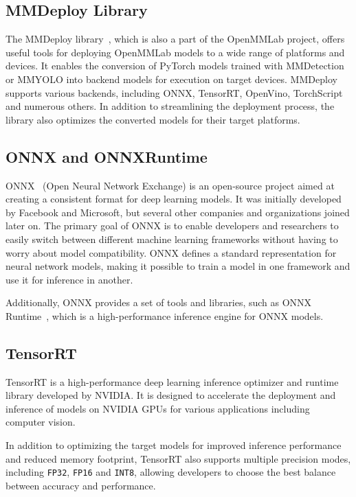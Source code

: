 \subsection{MMDeploy Library}

The MMDeploy library~\cite{MMDeploy}, which is also a part of the OpenMMLab project,
offers useful tools for deploying OpenMMLab models to a wide range of platforms
and devices. It enables the conversion of PyTorch models trained with
MMDetection or MMYOLO into backend models for execution on target devices.
MMDeploy supports various backends, including ONNX, TensorRT, OpenVino,
TorchScript and numerous others. In addition to streamlining the deployment
process, the library also optimizes the converted models for their target
platforms.


\subsection{ONNX and ONNXRuntime}

ONNX~\cite{ONNX} (Open Neural Network Exchange) is an open-source project aimed
at creating a consistent format for deep learning models. It was initially
developed by Facebook and Microsoft, but several other companies and
organizations joined later on. The primary goal of ONNX is to enable developers
and researchers to easily switch between different machine learning frameworks
without having to worry about model compatibility. ONNX defines a standard
representation for neural network models, making it possible to train a model in
one framework and use it for inference in another.

Additionally, ONNX provides a set of tools and libraries, such as ONNX
Runtime~\cite{ONNXRuntime}, which is a high-performance inference engine for
ONNX models.


\subsection{TensorRT}

TensorRT  is a high-performance deep learning inference optimizer and runtime
library developed by NVIDIA. It is designed to accelerate the deployment and
inference of models on NVIDIA GPUs for various applications including computer
vision.

In addition to optimizing the target models for improved inference
performance and reduced memory footprint, TensorRT also supports multiple
precision modes, including \texttt{FP32}, \texttt{FP16} and \texttt{INT8},
allowing developers to choose the best balance between accuracy and performance.



